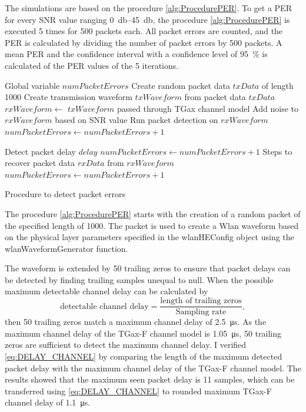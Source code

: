 The simulations are based on the procedure \autoref{alg:ProcedurePER}.
To get a \ac{PER} for every \ac{SNR} value ranging \SIrange{0}{45}{\decibel}, the procedure \autoref{alg:ProcedurePER} is executed \num{5} times for \num{500} packets each.
All packet errors are counted, and the \ac{PER} is calculated by dividing the number of packet errors by \num{500} packets.
A mean \ac{PER} and the confidence interval with a confidence level of
\SI{95}{\percent} is calculated of the \ac{PER} values of the \num{5} iterations.
\begin{algorithm}
\begin{algorithmic}[1]
\REQUIRE Global variable $numPacketErrors$
\STATE Create random packet data $txData$ of length \SI{1000}{\byte}
\STATE Create transmission waveform $txWaveform$ from packet data $txData$
\STATE $rxWaveform \gets $ $txWaveform$ passed through TGax channel model
\STATE Add noise to $rxWaveform$ based on \ac{SNR} value
\STATE Run packet detection on $rxWaveform$
    \STATE $numPacketErrors \gets numPacketErrors + 1$
\ENDIF

\STATE Detect packet delay $delay$
    \STATE $numPacketErrors \gets numPacketErrors + 1$
\ENDIF
\STATE Steps to recover packet data $rxData$ from $rxWaveform$
    \STATE $numPacketErrors \gets numPacketErrors + 1$
\ENDIF
\end{algorithmic}
\caption{Procedure to detect packet errors}
\label{alg:ProcedurePER}
\end{algorithm}

The procedure \autoref{alg:ProcedurePER} starts with the creation of a random packet of the specified length of \SI{1000}{\byte}.
The packet is used to create a Wlan waveform based on the physical layer parameters specified in the wlanHEConfig object using the wlanWaveformGenerator function.

The waveform is extended by
\num{50} trailing zeros to ensure that packet delays can be detected by finding trailing samples unequal to null.
When the possible maximum detectable channel delay can be calculated by
\begin{equation}\label{eq:DELAY_CHANNEL}
   \text{detectable channel delay} =
   \frac{
      \text{length of trailing zeros}
   }{
      \text{Sampling rate}
   }
   ,
\end{equation}
then \num{50} trailing zeros match a maximum channel delay of \SI{2.5}{\micro\second}.
As the maximum channel delay of the TGax-F channel model is \SI{1.05}{\micro\second},
\num{50} trailing zeros are sufficient to detect the maximum channel delay.
I verified \autoref{eq:DELAY_CHANNEL} by comparing
the length of the maximum detected packet delay with the maximum channel delay of the TGax-F channel model.
The results showed that the maximum seen packet delay is \num{11} samples,
which can be transferred using \autoref{eq:DELAY_CHANNEL} to rounded maximum TGax-F channel delay of \SI{1.1}{\micro\second}.

